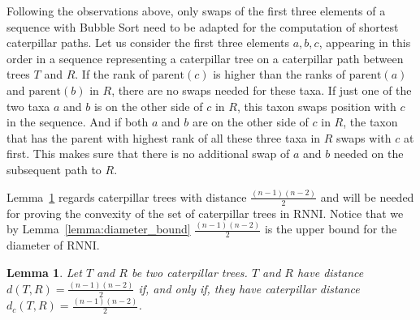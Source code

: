 \documentclass{amsart}
\newcommand{\parent}{\mathrm{parent}}
\newcommand{\rnni}{\mathrm{RNNI}}
\newtheorem{lemma}[definition]{Lemma}
\begin{document}
Following the observations above, only swaps of the first three elements of a sequence with Bubble Sort need to be adapted for the computation of shortest caterpillar paths.
Let us consider the first three elements $a,b,c$, appearing in this order in a sequence representing a caterpillar tree on a caterpillar path between trees $T$ and $R$.
If the rank of $\parent(c)$ is higher than the ranks of $\parent(a)$ and $\parent(b)$ in $R$, there are no swaps needed for these taxa.
If just one of the two taxa $a$ and $b$ is on the other side of $c$ in $R$, this taxon swaps position with $c$ in the sequence.
And if both $a$ and $b$ are on the other side of $c$ in $R$, the taxon that has the parent with highest rank of all these three taxa in $R$ swaps with $c$ at first.
This makes sure that there is no additional swap of $a$ and $b$ needed on the subsequent path to $R$.

Lemma~\ref{lemma:caterpillar_dist=diameter} regards caterpillar trees with distance $\frac{(n-1)(n-2)}{2}$ and will be needed for proving the convexity of the set of caterpillar trees in $\rnni$.
Notice that we by Lemma~\ref{lemma:diameter_bound} $\frac{(n-1)(n-2)}{2}$ is the upper bound for the diameter of $\rnni$.

\begin{lemma}
    Let $T$ and $R$ be two caterpillar trees.
    $T$ and $R$ have distance $d(T,R) = \frac{(n-1)(n-2)}{2}$ if, and only if, they have caterpillar distance $d_c(T,R) = \frac{(n-1)(n-2)}{2}$.
    \label{lemma:caterpillar_dist=diameter}
\end{lemma}
\end{document}
